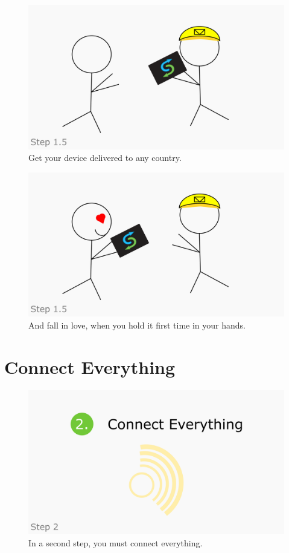 \documentclass[a4paper,12pt]{article}
\begin{document}
\begin{figure}[htbp!]
	\centering
	\includegraphics[width=0.7\linewidth]{../frames/19.png}
	\caption{Get your device delivered to any country.}
	\label{fig:9}
\end{figure}

\begin{figure}[htbp!]
	\centering
	\includegraphics[width=0.7\linewidth]{../frames/21.png}
	\caption{And fall in love, when you hold it first time in your hands.}
	\label{fig:10}
\end{figure}

\section{Connect Everything}

\begin{figure}[htbp!]
	\centering
	\includegraphics[width=0.7\linewidth]{../frames/22.png}
	\caption{In a second step, you must connect everything.}
	\label{fig:11}
\end{figure}
\end{document}
